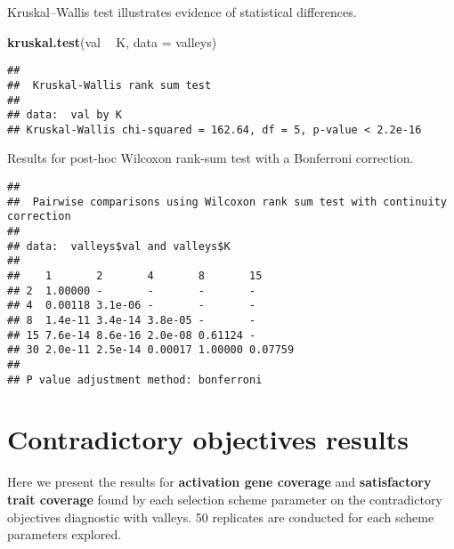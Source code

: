 \documentclass[]{book}
\newenvironment{Shaded}{\begin{snugshade}}{\end{snugshade}}
\newcommand{\DataTypeTok}[1]{\textcolor[rgb]{0.13,0.29,0.53}{#1}}
\newcommand{\KeywordTok}[1]{\textcolor[rgb]{0.13,0.29,0.53}{\textbf{#1}}}
\newcommand{\NormalTok}[1]{#1}
\newcommand{\OperatorTok}[1]{\textcolor[rgb]{0.81,0.36,0.00}{\textbf{#1}}}
\newcommand{\OtherTok}[1]{\textcolor[rgb]{0.56,0.35,0.01}{#1}}
\newcommand{\StringTok}[1]{\textcolor[rgb]{0.31,0.60,0.02}{#1}}
\begin{document}
Kruskal--Wallis test illustrates evidence of statistical differences.

\begin{Shaded}
\begin{Highlighting}[]
\KeywordTok{kruskal.test}\NormalTok{(val }\OperatorTok{~}\StringTok{ }\NormalTok{K, }\DataTypeTok{data =}\NormalTok{ valleys)}
\end{Highlighting}
\end{Shaded}

\begin{verbatim}
## 
##  Kruskal-Wallis rank sum test
## 
## data:  val by K
## Kruskal-Wallis chi-squared = 162.64, df = 5, p-value < 2.2e-16
\end{verbatim}

Results for post-hoc Wilcoxon rank-sum test with a Bonferroni correction.

\begin{Shaded}
\end{Shaded}

\begin{verbatim}
## 
##  Pairwise comparisons using Wilcoxon rank sum test with continuity correction 
## 
## data:  valleys$val and valleys$K 
## 
##    1       2       4       8       15     
## 2  1.00000 -       -       -       -      
## 4  0.00118 3.1e-06 -       -       -      
## 8  1.4e-11 3.4e-14 3.8e-05 -       -      
## 15 7.6e-14 8.6e-16 2.0e-08 0.61124 -      
## 30 2.0e-11 2.5e-14 0.00017 1.00000 0.07759
## 
## P value adjustment method: bonferroni
\end{verbatim}

\hypertarget{contradictory-objectives-results-3}{%
\section{Contradictory objectives results}\label{contradictory-objectives-results-3}}

Here we present the results for \textbf{activation gene coverage} and \textbf{satisfactory trait coverage} found by each selection scheme parameter on the contradictory objectives diagnostic with valleys.
50 replicates are conducted for each scheme parameters explored.
\end{document}
